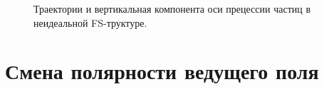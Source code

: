 \begin{figure}[!h]
	\centering
	\hfill
	\hfill
	\caption{Траектории и вертикальная компонента оси прецессии частиц в неидеальной FS-труктуре.\label{fig:ny_on_traj}}
\end{figure}

\section{Смена полярности ведущего поля} \label{sect3_2}

\clearpage
